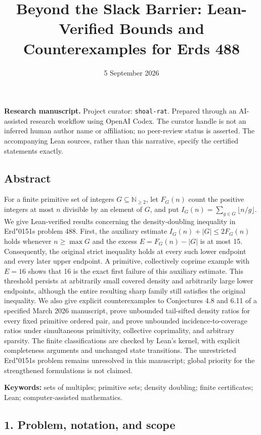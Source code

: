 \documentclass[
  11pt,
]{article}
\title{Beyond the Slack Barrier: Lean-Verified Bounds and
Counterexamples for Erd\texorpdfstring{\odoubleacute}{o}s 488}
\author{}
\date{5 September 2026}
\newcommand{\odoubleacute}{{\accentfont\char"0151}}
\begin{document}
\maketitle

\textbf{Research manuscript.} Project curator: \texttt{shoal-rat}.
Prepared through an AI-assisted research workflow using OpenAI Codex.
The curator handle is not an inferred human author name or affiliation;
no peer-review status is asserted. The accompanying Lean sources, rather
than this narrative, specify the certified statements exactly.

\hypertarget{abstract}{%
\subsection{Abstract}\label{abstract}}

For a finite primitive set of integers \(G\subseteq\mathbb N_{\ge2}\),
let \(F_G(n)\) count the positive integers at most \(n\) divisible by an
element of \(G\), and put \(I_G(n)=\sum_{g\in G}\lfloor n/g\rfloor\). We
give Lean-verified results concerning the density-doubling inequality in
Erd\texorpdfstring{\odoubleacute}{o}s problem 488. First, the auxiliary estimate
\(I_G(n)+|G|\le2F_G(n)\) holds whenever \(n\ge\max G\) and the excess
\(E=F_G(n)-|G|\) is at most 15. Consequently, the original strict
inequality holds at every such lower endpoint and every later upper
endpoint. A primitive, collectively coprime example with \(E=16\) shows
that 16 is the exact first failure of this auxiliary estimate. This
threshold persists at arbitrarily small covered density and arbitrarily
large lower endpoints, although the entire resulting sharp family still
satisfies the original inequality. We also give explicit counterexamples
to Conjectures 4.8 and 6.11 of a specified March 2026 manuscript, prove
unbounded tail-sifted density ratios for every fixed primitive ordered
pair, and prove unbounded incidence-to-coverage ratios under
simultaneous primitivity, collective coprimality, and arbitrary
sparsity. The finite classifications are checked by Lean's kernel, with
explicit completeness arguments and unchanged state transitions. The
unrestricted Erd\texorpdfstring{\odoubleacute}{o}s problem remains unresolved in this manuscript; global
priority for the strengthened formulations is not claimed.

\textbf{Keywords:} sets of multiples; primitive sets; density doubling;
finite certificates; Lean; computer-assisted mathematics.

\hypertarget{problem-notation-and-scope}{%
\subsection{1. Problem, notation, and
scope}\label{problem-notation-and-scope}}
\end{document}
